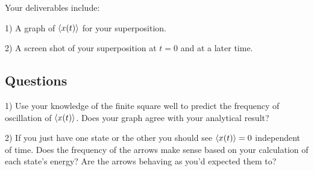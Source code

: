 \documentclass[11pt]{article} %
\begin{document}
Your deliverables include:

1) A graph of $\braket{x(t)}$ for your superposition.

2) A screen shot of your superposition at $t=0$ and at a later time.

\subsection*{Questions}

1) Use your knowledge of the finite square well to predict the frequency of oscillation of $\braket{x(t)}$. Does your graph agree with your analytical result?

2) If you just have one state or the other you should see $\braket{x(t)} = 0$ independent of time. Does the frequency of the arrows make sense based on your calculation of each state's energy? Are the arrows behaving as you'd expected them to?
\end{document}
